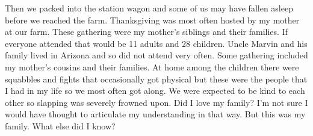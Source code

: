 Then we packed into the station wagon and some of us may have fallen asleep before we reached the farm.
Thanksgiving was most often hosted by my mother at our farm.
These gathering were my mother's siblings and their families.
If everyone attended that would be 11 adults and 28 children.
Uncle Marvin and his family lived in Arizona and so did not attend very often.
Some gathering included my mother's cousins and their families.
At home among the children there were squabbles and fights that occasionally got physical but these were the people that I had in my life so we most often got along.
We were expected to be kind to each other so slapping was severely frowned upon.
Did I love my family? I'm not sure I would have thought to articulate my understanding in that way.
But this was my family.
What else did I know?




